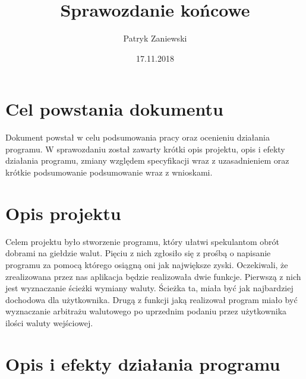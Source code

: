 \documentclass[12pt]{article}
\title{Sprawozdanie końcowe}
\author{Patryk Zaniewski }
\date{17.11.2018}
\begin{document}
\maketitle

\tableofcontents
\newpage

\section{Cel powstania dokumentu}
Dokument powstał w celu podsumowania pracy oraz ocenieniu działania programu. W sprawozdaniu został zawarty krótki opis projektu, opis i efekty działania programu, zmiany względem specyfikacji wraz z uzasadnieniem oraz krótkie podsumowanie podsumowanie wraz z wnioskami.

\section{Opis projektu}
Celem projektu było stworzenie programu, który ułatwi spekulantom obrót dobrami na giełdzie walut. Pięciu z nich zgłosiło się z prośbą o napisanie programu za pomocą którego osiągną oni jak największe zyski. Oczekiwali, że zrealizowana przez nas aplikacja będzie realizowała dwie funkcje. Pierwszą z nich jest wyznaczanie ścieżki wymiany waluty. Ścieżka ta, miała być jak najbardziej dochodowa dla użytkownika. Drugą z funkcji jaką realizował program miało być wyznaczanie arbitrażu walutowego po uprzednim podaniu przez użytkownika ilości waluty wejściowej.

\section{Opis i efekty działania programu}
\end{document}
